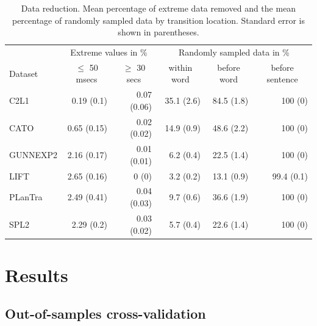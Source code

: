 \documentclass[
  english,
  man,floatsintext]{apa7}
\begin{document}
\begin{table}[bp!]

\begin{center}
\begin{threeparttable}

\caption{\label{tab:datareduction}Data reduction. Mean percentage of extreme data removed and the mean percentage of randomly sampled data by transition location. Standard error is shown in parentheses.}

\begin{tabular}{lrrrrr}
\toprule
 \multicolumn{1}{c}{ } & \multicolumn{2}{c}{Extreme values in \%} & \multicolumn{3}{c}{Randomly sampled data in \%} \\
\cmidrule(r){1-1} \cmidrule(r){2-3} \cmidrule(r){4-6}
Dataset & \multicolumn{1}{c}{$\le$ 50 msecs} & \multicolumn{1}{c}{$\ge$ 30 secs} & \multicolumn{1}{c}{within word} & \multicolumn{1}{c}{before word} & \multicolumn{1}{c}{before sentence}\\
\midrule
C2L1 & 0.19 (0.1) & 0.07 (0.06) & 35.1 (2.6) & 84.5 (1.8) & 100 (0)\\
CATO & 0.65 (0.15) & 0.02 (0.02) & 14.9 (0.9) & 48.6 (2.2) & 100 (0)\\
GUNNEXP2 & 2.16 (0.17) & 0.01 (0.01) & 6.2 (0.4) & 22.5 (1.4) & 100 (0)\\
LIFT & 2.65 (0.16) & 0 (0) & 3.2 (0.2) & 13.1 (0.9) & 99.4 (0.1)\\
PLanTra & 2.49 (0.41) & 0.04 (0.03) & 9.7 (0.6) & 36.6 (1.9) & 100 (0)\\
SPL2 & 2.29 (0.2) & 0.03 (0.02) & 5.7 (0.4) & 22.6 (1.4) & 100 (0)\\
\bottomrule
\end{tabular}

\end{threeparttable}
\end{center}

\end{table}

\hypertarget{results}{%
\section{Results}\label{results}}

\hypertarget{out-of-samples-cross-validation}{%
\subsection{Out-of-samples cross-validation}\label{out-of-samples-cross-validation}}
\end{document}
